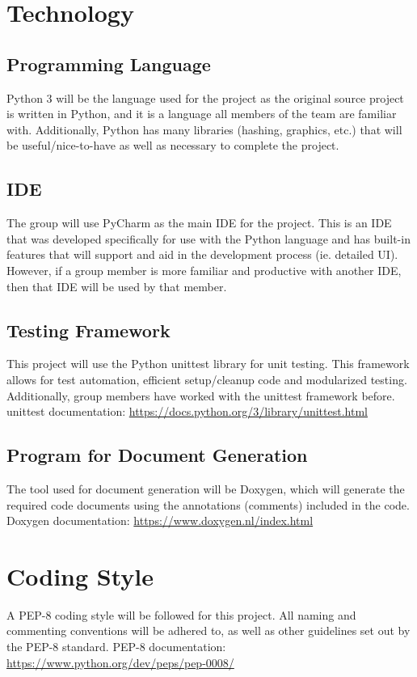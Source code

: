 \documentclass{article}
\begin{document}
\section{Technology}
\subsection{Programming Language}
Python 3 will be the language used for the project as the original source project is written in Python, and it is a language all members of the team are familiar with.
Additionally, Python has many libraries (hashing, graphics, etc.) that will be useful/nice-to-have as well as necessary to complete the project. 
\subsection{IDE}
The group will use PyCharm as the main IDE for the project. This is an IDE that was developed specifically for use with the Python language and has built-in features that will support and aid in the development process (ie. detailed UI).
However, if a group member is more familiar and productive with another IDE, then that IDE will be used by that member.
\subsection{Testing Framework}
This project will use the Python unittest library for unit testing. This framework allows for test automation, efficient setup/cleanup code and modularized testing. Additionally, group members have worked with
the unittest framework before.
unittest documentation: \href{https://docs.python.org/3/library/unittest.html}{https://docs.python.org/3/library/unittest.html}
\subsection{Program for Document Generation}
The tool used for document generation will be Doxygen, which will generate the required code documents using the annotations (comments) included in the code.
Doxygen documentation: \href{https://www.doxygen.nl/index.html}{https://www.doxygen.nl/index.html}
\section{Coding Style}
A PEP-8 coding style will be followed for this project. All naming and commenting conventions will be adhered to, as well as other guidelines set out by the PEP-8 standard.
PEP-8 documentation: \href{https://www.python.org/dev/peps/pep-0008/}{https://www.python.org/dev/peps/pep-0008/}
\end{document}
